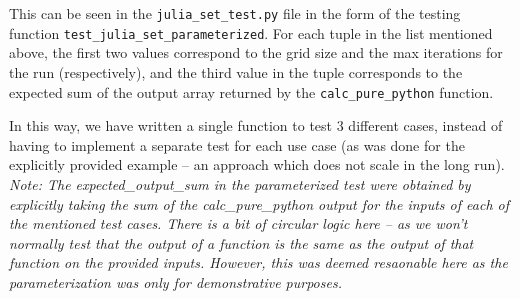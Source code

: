 \documentclass[a4paper,12pt]{article}
\begin{document}
This can be seen in the \verb|julia_set_test.py| file in the form of the testing function \verb|test_julia_set_parameterized|. For each tuple in the list mentioned above, the first two values correspond to the grid size and the max iterations for the run (respectively), and the third value in the tuple corresponds to the expected sum of the output array returned by the \verb|calc_pure_python| function. 

In this way, we have written a single function to test 3 different cases, instead of having to implement a separate test for each use case (as was done for the explicitly provided example -- an approach which does not scale in the long run).  \\
\textit{Note: The expected\_output\_sum in the parameterized test were obtained by explicitly taking the sum of the calc\_pure\_python output for the inputs of each of the mentioned test cases. There is a bit of circular logic here -- as we won't normally test that the output of a function is the same as the output of that function on the provided inputs. However, this was deemed resaonable here as the parameterization was only for demonstrative purposes.}
\end{document}
